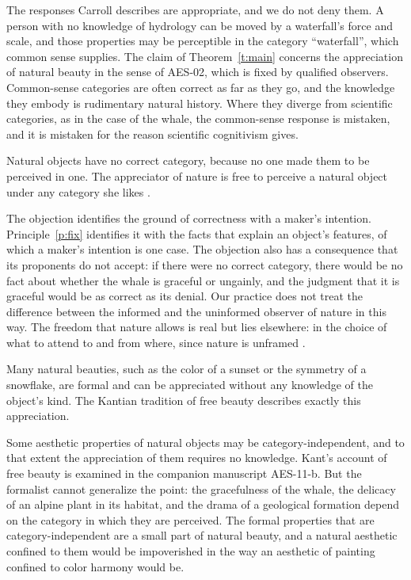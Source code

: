 \documentclass{situationist-preprint}
\begin{document}
\begin{reply}
The responses Carroll describes are appropriate, and we do not deny them. A person with no knowledge of hydrology can be moved by a waterfall's force and scale, and those properties may be perceptible in the category \enquote{waterfall}, which common sense supplies. The claim of Theorem~\ref{t:main} concerns the appreciation of natural beauty in the sense of AES-02, which is fixed by qualified observers. Common-sense categories are often correct as far as they go, and the knowledge they embody is rudimentary natural history. Where they diverge from scientific categories, as in the case of the whale, the common-sense response is mistaken, and it is mistaken for the reason scientific cognitivism gives.
\end{reply}

\begin{objection}[Freedom]\label{o:freedom}
Natural objects have no correct category, because no one made them to be perceived in one. The appreciator of nature is free to perceive a natural object under any category she likes \citep{Budd2002}.
\end{objection}

\begin{reply}
The objection identifies the ground of correctness with a maker's intention. Principle~\ref{p:fix} identifies it with the facts that explain an object's features, of which a maker's intention is one case. The objection also has a consequence that its proponents do not accept: if there were no correct category, there would be no fact about whether the whale is graceful or ungainly, and the judgment that it is graceful would be as correct as its denial. Our practice does not treat the difference between the informed and the uninformed observer of nature in this way. The freedom that nature allows is real but lies elsewhere: in the choice of what to attend to and from where, since nature is unframed \citep{Hepburn1966}.
\end{reply}

\begin{objection}[Formalism]\label{o:formal}
Many natural beauties, such as the color of a sunset or the symmetry of a snowflake, are formal and can be appreciated without any knowledge of the object's kind. The Kantian tradition of free beauty describes exactly this appreciation.
\end{objection}

\begin{reply}
Some aesthetic properties of natural objects may be category-independent, and to that extent the appreciation of them requires no knowledge. Kant's account of free beauty is examined in the companion manuscript AES-11-b. But the formalist cannot generalize the point: the gracefulness of the whale, the delicacy of an alpine plant in its habitat, and the drama of a geological formation depend on the category in which they are perceived. The formal properties that are category-independent are a small part of natural beauty, and a natural aesthetic confined to them would be impoverished in the way an aesthetic of painting confined to color harmony would be.
\end{reply}
\end{document}
